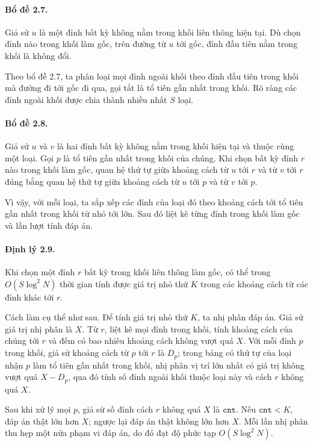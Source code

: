 \documentclass[11pt]{article}
\begin{document}
\paragraph{Bổ đề 2.7.}
Giả sử \(u\) là một đỉnh bất kỳ không nằm trong khối liên thông hiện tại. Dù
chọn đỉnh nào trong khối làm gốc, trên đường từ \(u\) tới gốc, đỉnh đầu tiên
nằm trong khối là không đổi.

Theo bổ đề 2.7, ta phân loại mọi đỉnh ngoài khối theo đỉnh đầu tiên trong
khối mà đường đi tới gốc đi qua, gọi tắt là tổ tiên gần nhất trong khối. Rõ
ràng các đỉnh ngoài khối được chia thành nhiều nhất \(S\) loại.

\paragraph{Bổ đề 2.8.}
Giả sử \(u\) và \(v\) là hai đỉnh bất kỳ không nằm trong khối hiện tại và
thuộc cùng một loại. Gọi \(p\) là tổ tiên gần nhất trong khối của chúng. Khi
chọn bất kỳ đỉnh \(r\) nào trong khối làm gốc, quan hệ thứ tự giữa khoảng
cách từ \(u\) tới \(r\) và từ \(v\) tới \(r\) đúng bằng quan hệ thứ tự giữa
khoảng cách từ \(u\) tới \(p\) và từ \(v\) tới \(p\).

Vì vậy, với mỗi loại, ta sắp xếp các đỉnh của loại đó theo khoảng cách tới
tổ tiên gần nhất trong khối từ nhỏ tới lớn. Sau đó liệt kê từng đỉnh trong
khối làm gốc và lần lượt tính đáp án.

\paragraph{Định lý 2.9.}
Khi chọn một đỉnh \(r\) bất kỳ trong khối liên thông làm gốc, có thể trong
\(O(S\log^2 N)\) thời gian tính được giá trị nhỏ thứ \(K\) trong các khoảng
cách từ các đỉnh khác tới \(r\).

Cách làm cụ thể như sau. Để tính giá trị nhỏ thứ \(K\), ta nhị phân đáp án.
Giả sử giá trị nhị phân là \(X\). Từ \(r\), liệt kê mọi đỉnh trong khối, tính
khoảng cách của chúng tới \(r\) và đếm có bao nhiêu khoảng cách không vượt
quá \(X\). Với mỗi đỉnh \(p\) trong khối, giả sử khoảng cách từ \(p\) tới
\(r\) là \(D_p\); trong bảng có thứ tự của loại nhận \(p\) làm tổ tiên gần
nhất trong khối, nhị phân vị trí lớn nhất có giá trị không vượt quá
\(X-D_p\), qua đó tính số đỉnh ngoài khối thuộc loại này và cách \(r\) không
quá \(X\).

Sau khi xử lý mọi \(p\), giả sử số đỉnh cách \(r\) không quá \(X\) là
\(\texttt{cnt}\). Nếu \(\texttt{cnt}<K\), đáp án thật lớn hơn \(X\); ngược
lại đáp án thật không lớn hơn \(X\). Mỗi lần nhị phân thu hẹp một nửa phạm
vi đáp án, do đó đạt độ phức tạp \(O(S\log^2 N)\).
\end{document}
